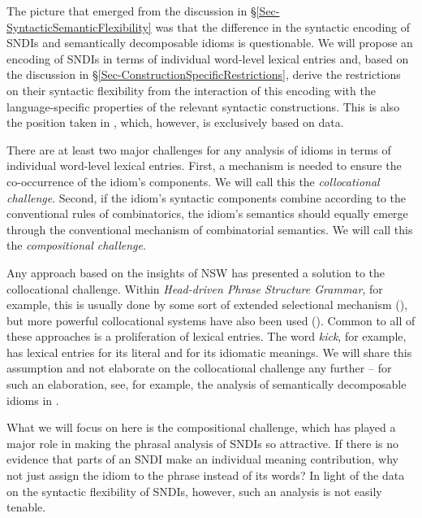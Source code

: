 \documentclass[output=paper]{langsci/langscibook}
\begin{document}
The picture that emerged from the discussion in §\ref{Sec-SyntacticSemanticFlexibility} was that the dif\-ference in the syntactic encoding of SNDIs and  semantically decomposable idioms is questionable. We will propose an encoding of SNDIs in terms of individual word-level lexical entries and, based on the discussion in §\ref{Sec-ConstructionSpecificRestrictions}, derive the restrictions on their syntactic flexibility from the interaction of this encoding with the language-specific properties of the relevant syntactic constructions. This is also the position taken in \cite{kaysagidioms}, which, however, is exclusively based on  data.

There are at least two major challenges for any analysis of idioms in terms of individual word-level lexical entries. First, a mechanism is needed to ensure the co-occurrence of the idiom's components. 
We will call this the \emph{collocational challenge}.
Second, if the idiom's syntactic components combine according to the conventional rules of combinatorics, the idiom's semantics should equally emerge through the conventional mechanism of combinatorial semantics. We will call this the \emph{compositional challenge}.

Any approach based on the insights of NSW has presented a solution to the collocational challenge. Within 
 \emph{Head-driven Phrase Structure Grammar}, for example, this is usually done by some sort of extended selectional mechanism (\citealt{Krenn:Erbach:94, Soehn:Sailer:03, Sag:07hpsg, kaysagidioms}), but more powerful collocational systems have also been used (\citealt{Riehemann:01,Sailer:diss,Soehn:diss}). Common to all of these approaches is a proliferation of lexical entries. The word \textit{kick}, for example, has lexical entries for its literal and for its idiomatic meanings. We will share this assumption and not elaborate on the collocational challenge any further -- for such an elaboration, see, for example, the analysis of 
 semantically decomposable idioms in \cite{Webelhuth:al:14}.

What we will focus on here is the compositional challenge, which has played a major role in making the phrasal analysis of SNDIs so attractive. 
If there is no evidence that parts of an SNDI make an individual meaning contribution, why not just assign the idiom  to the phrase instead of its words? 
In light of the data on the syntactic flexibility of SNDIs, however, such an analysis is not easily tenable.
\end{document}
